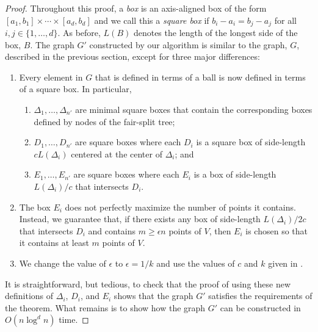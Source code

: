 \documentclass{patmorin}
\begin{document}
\begin{proof}
  Throughout this proof, a \emph{box} is an axis-aligned box of the form
  $[a_1,b_1]\times\cdots\times[a_d,b_d]$ and we call this a \emph{square
  box} if $b_i-a_i=b_j-a_j$ for all $i,j\in\{1,\ldots,d\}$. As before,
  $L(B)$ denotes the length of the longest side of the box, $B$.  The
  graph $G'$ constructed by our algorithm is similar to the graph, $G$,
  described in the previous section, except for three major differences:
  \begin{enumerate}
     \item Every element in $G$ that is defined in terms of a ball is
     now defined in terms of a square box.  In particular,
     \begin{enumerate}
       \item $\Delta_1,\ldots,\Delta_{n'}$ are minimal square boxes that contain
         the corresponding boxes defined by nodes of the fair-split tree;
       \item $D_1,\ldots,D_{n'}$ are square boxes where each $D_i$
         is a square box of side-length $cL(\Delta_i)$ centered at the
         center of $\Delta_i$; and
       \item $E_1,\ldots,E_{n'}$ are square boxes where each $E_i$ is a box of
         side-length $L(\Delta_i)/c$ that intersects $D_i$.
     \end{enumerate}
     \item The box $E_i$ does not perfectly maximize the number of points
       it contains. Instead, we guarantee that, if there exists any
       box of side-length $L(\Delta_i)/2c$ that intersects $D_i$ and
       contains $m\ge \epsilon n$ points of $V$, then $E_i$ is chosen so that
       it contains at least $m$ points of $V$.
     \item We change the value of $\epsilon$ to $\epsilon = 1/k$
      and use the values of $c$ and $k$ given in .
  \end{enumerate} 
  It is straightforward, but tedious, to check that the proof of
   using these new definitions of $\Delta_i$,
  $D_i$, and $E_i$ shows that the graph $G'$ satisfies the
  requirements of the theorem.  What remains is to show how the graph $G'$
  can be constructed in $O(n\log^d n)$ time.


\end{proof}
\end{document}
